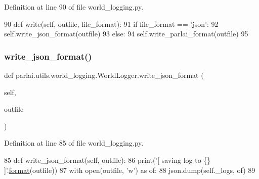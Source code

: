 Definition at line 90 of file world\+\_\+logging.\+py.


\begin{DoxyCode}
90     \textcolor{keyword}{def }write(self, outfile, file\_format):
91         \textcolor{keywordflow}{if} file\_format == \textcolor{stringliteral}{'json'}:
92             self.write\_json\_format(outfile)
93         \textcolor{keywordflow}{else}:
94             self.write\_parlai\_format(outfile)
95 \end{DoxyCode}
\mbox{\label{classparlai_1_1utils_1_1world__logging_1_1WorldLogger_aeb4a988aa27d9cd9a5df43feefff9748}} 
\subsubsection{\texorpdfstring{write\+\_\+json\+\_\+format()}{write\_json\_format()}}
{\footnotesize\ttfamily def parlai.\+utils.\+world\+\_\+logging.\+World\+Logger.\+write\+\_\+json\+\_\+format (\begin{DoxyParamCaption}\item[{}]{self,  }\item[{}]{outfile }\end{DoxyParamCaption})}



Definition at line 85 of file world\+\_\+logging.\+py.


\begin{DoxyCode}
85     \textcolor{keyword}{def }write\_json\_format(self, outfile):
86         print(\textcolor{stringliteral}{'[ saving log to \{\} ]'}.\hyperlink{namespaceparlai_1_1chat__service_1_1services_1_1messenger_1_1shared__utils_a32e2e2022b824fbaf80c747160b52a76}{format}(outfile))
87         with open(outfile, \textcolor{stringliteral}{'w'}) \textcolor{keyword}{as} of:
88             json.dump(self.\_logs, of)
89 
\end{DoxyCode}
\mbox{\label{classparlai_1_1utils_1_1world__logging_1_1WorldLogger_a9a5210ac32adcaec88d4b33265cbba92}} 
